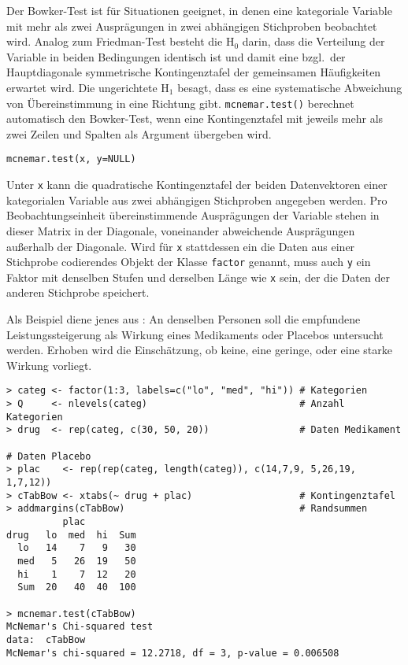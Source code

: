 Der Bowker-Test ist für Situationen geeignet, in denen eine kategoriale Variable mit mehr als zwei Ausprägungen in zwei abhängigen Stichproben beobachtet wird. Analog zum Friedman-Test besteht die $\text{H}_{0}$ darin, dass die Verteilung der Variable in beiden Bedingungen identisch ist und damit eine bzgl.\ der Hauptdiagonale symmetrische Kontingenztafel der gemeinsamen Häufigkeiten erwartet wird. Die ungerichtete $\text{H}_{1}$ besagt, dass es eine systematische Abweichung von Übereinstimmung in eine Richtung gibt.  \lstinline!mcnemar.test()! berechnet automatisch den Bowker-Test, wenn eine Kontingenztafel mit jeweils mehr als zwei Zeilen und Spalten als Argument übergeben wird.
\begin{lstlisting}
mcnemar.test(x, y=NULL)
\end{lstlisting}

Unter \lstinline!x! kann die quadratische Kontingenztafel der beiden Datenvektoren einer kategorialen Variable aus zwei abhängigen Stichproben angegeben werden. Pro Beobachtungseinheit übereinstimmende Ausprägungen der Variable stehen in dieser Matrix in der Diagonale, voneinander abweichende Ausprägungen außerhalb der Diagonale. Wird für \lstinline!x! stattdessen ein die Daten aus einer Stichprobe codierendes Objekt der Klasse \lstinline!factor! genannt, muss auch \lstinline!y! ein Faktor mit denselben Stufen und derselben Länge wie \lstinline!x! sein, der die Daten der anderen Stichprobe speichert.

Als Beispiel diene jenes aus : An denselben Personen soll die empfundene Leistungssteigerung als Wirkung eines Medikaments oder Placebos untersucht werden. Erhoben wird die Einschätzung, ob keine, eine geringe, oder eine starke Wirkung vorliegt.
\begin{lstlisting}
> categ <- factor(1:3, labels=c("lo", "med", "hi")) # Kategorien
> Q     <- nlevels(categ)                           # Anzahl Kategorien
> drug  <- rep(categ, c(30, 50, 20))                # Daten Medikament

# Daten Placebo
> plac    <- rep(rep(categ, length(categ)), c(14,7,9, 5,26,19, 1,7,12))
> cTabBow <- xtabs(~ drug + plac)                   # Kontingenztafel
> addmargins(cTabBow)                               # Randsummen
          plac
drug   lo  med  hi  Sum
  lo   14    7   9   30
  med   5   26  19   50
  hi    1    7  12   20
  Sum  20   40  40  100

> mcnemar.test(cTabBow)
McNemar's Chi-squared test
data:  cTabBow
McNemar's chi-squared = 12.2718, df = 3, p-value = 0.006508
\end{lstlisting}

